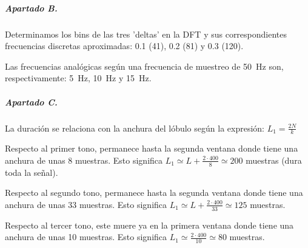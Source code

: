 \subparagraph{Apartado B.}

Determinamos los bins de las tres 'deltas' en la DFT y sus correspondientes
frecuencias discretas aproximadas: \num{0.1} (\num{41}), \num{0.2} (\num{81})
y \num{0.3} (\num{120}).

Las frecuencias analógicas según una frecuencia de muestreo de \SI{50}{\hertz}
son, respectivamente: \SI{5}{\hertz}, \SI{10}{\hertz} y \SI{15}{\hertz}.

\subparagraph{Apartado C.}

La duración se relaciona con la anchura del lóbulo según la expresión:
$L_1 = \frac{2N}{k}$

Respecto al primer tono, permanece hasta la segunda ventana donde tiene una
anchura de unas 8 muestras. Esto significa $L_1 \simeq L + \frac{2\cdot 400}{8}
\simeq 200$ muestras (dura toda la señal).

Respecto al segundo tono, permanece hasta la segunda ventana donde tiene una
anchura de unas 33 muestras. Esto significa $L_1 \simeq L + \frac{2\cdot 400}{33}
\simeq 125$ muestras.

Respecto al tercer tono, este muere ya en la primera ventana donde tiene una
anchura de unas 10 muestras. Esto significa $L_1 \simeq \frac{2\cdot 400}{10}
\simeq 80$ muestras.


\finishpage

